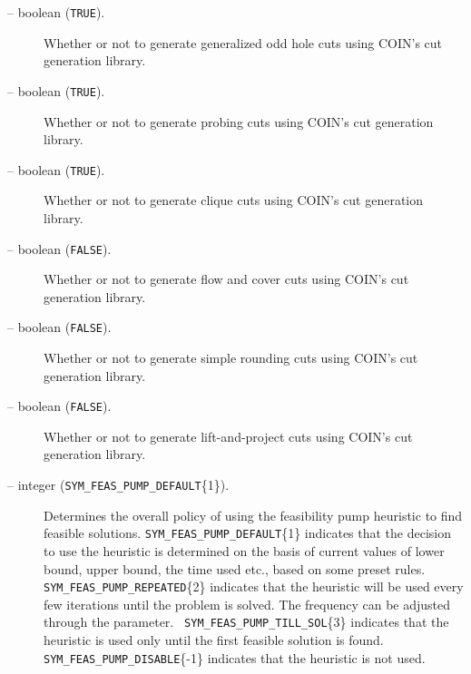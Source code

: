 \begin{description}
\item[ -- boolean ({\tt TRUE}).] 
Whether or not to generate generalized odd hole cuts using COIN's cut 
generation library. 

\item[ -- boolean ({\tt TRUE}).] 
Whether or not to generate probing cuts using COIN's cut generation library. 

\item[ -- boolean ({\tt TRUE}).] 
Whether or not to generate clique cuts using COIN's cut generation library. 

\item[ -- boolean ({\tt FALSE}).] 
Whether or not to generate flow and cover cuts using COIN's cut generation 
library. 

\item[ -- boolean ({\tt FALSE}).] 
Whether or not to generate simple rounding cuts using COIN's cut generation 
library. 

\item[ -- boolean ({\tt FALSE}).] 
Whether or not to generate lift-and-project cuts using COIN's cut generation 
library. 

\label{fp_enabled}
\item[ -- integer ({\tt SYM\_FEAS\_PUMP\_DEFAULT}\{1\}).] 
Determines the overall policy of using the feasibility pump heuristic to find
feasible solutions. {\tt SYM\_FEAS\_PUMP\_DEFAULT}\{1\} indicates that the
decision to use the heuristic is determined on the basis of current values of
lower bound, upper bound, the time used etc., based on some preset rules. {\tt
SYM\_FEAS\_PUMP\_REPEATED}\{2\} indicates that the heuristic will be used
every few iterations until the problem is solved. The frequency can be
adjusted through the  parameter.  {\tt
SYM\_FEAS\_PUMP\_TILL\_SOL}\{3\} indicates that the heuristic is used only
until the first feasible solution is found. {\tt
SYM\_FEAS\_PUMP\_DISABLE}\{-1\} indicates that the heuristic is not used.


\end{description}
